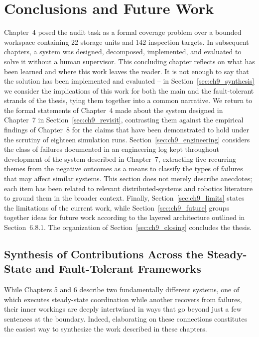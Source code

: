 \chapter{Conclusions and Future Work\label{cha:chapter9}}

Chapter~4 posed the audit task as a formal coverage problem over a bounded workspace containing 22 storage units and 142 inspection targets. In subsequent chapters, a system was designed, decomposed, implemented, and evaluated to solve it without a human supervisor. This concluding chapter reflects on what has been learned and where this work leaves the reader. It is not enough to say that the solution has been implemented and evaluated -- in Section~\ref{sec:ch9_synthesis} we consider the implications of this work for both the main and the fault-tolerant strands of the thesis, tying them together into a common narrative. We return to the formal statements of Chapter~4 made about the system designed in Chapter~7 in Section~\ref{sec:ch9_revisit}, contrasting them against the empirical findings of Chapter~8 for the claims that have been demonstrated to hold under the scrutiny of eighteen simulation runs. Section~\ref{sec:ch9_engineering} considers the class of failures documented in an engineering log kept throughout development of the system described in Chapter~7, extracting five recurring themes from the negative outcomes as a means to classify the types of failures that may affect similar systems. This section does not merely describe anecdotes; each item has been related to relevant distributed-systems and robotics literature to ground them in the broader context. Finally, Section~\ref{sec:ch9_limits} states the limitations of the current work, while Section~\ref{sec:ch9_future} groups together ideas for future work according to the layered architecture outlined in Section~6.8.1. The organization of Section~\ref{sec:ch9_closing} concludes the thesis.

\section{Synthesis of Contributions Across the Steady-State and Fault-Tolerant Frameworks\label{sec:ch9_synthesis}}

While Chapters 5 and 6 describe two fundamentally different systems, one of which executes steady-state coordination while another recovers from failures, their inner workings are deeply intertwined in ways that go beyond just a few sentences at the boundary. Indeed, elaborating on these connections constitutes the easiest way to synthesize the work described in these chapters.

